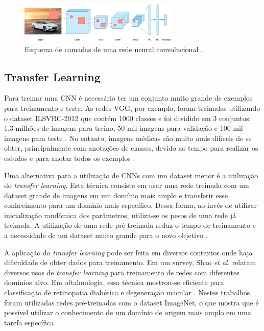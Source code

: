 \documentclass[conference]{IEEEtran}
\begin{document}

\begin{figure}[!tp]
 \centering
 \includegraphics[width=3in]{img/convolucao.png}
 \caption{Esquema de camadas de uma rede neural convolucional \cite{convTDS}.}
 \label{fig:convolucao}
\end{figure}


  \subsection{Transfer Learning}


  Para treinar uma CNN é necessário ter um conjunto muito grande de exemplos para treinamento e teste. As redes VGG, por exemplo, foram treinadas utilizando o dataset ILSVRC-2012 \cite{ILSVRC15} que contém 1000 classes e foi dividido em 3 conjuntos: 1.3 milhões de imagens para treino, 50 mil imagens para validação e 100 mil imagens para teste \cite{simonyan2014}. No entanto, imagens médicas são muito mais difíceis de se obter, principalmente com anotações de classes, devido ao tempo para realizar os estudos e para anotar todos os exemplos \cite{greenspan2016}.
  
  Uma alternativa para a utilização de CNNs com um dataset menor é a utilização do \textit{transfer learning}. Esta técnica consiste em usar uma rede treinada com um dataset grande de imagens em um domínio mais amplo e transferir esse conhecimento para um domínio mais específico. Dessa forma, ao invés de utilizar inicialização randômica dos parâmetros, utiliza-se os pesos de uma rede já treinada. A utilização de uma rede pré-treinada reduz o tempo de treinamento e a necessidade de um dataset muito grande para o novo objetivo \cite{tan2018}.

  A aplicação do \textit{transfer learning} pode ser feita em diversos contextos onde haja dificuldade de obter dados para treinamento. Em um survey, Shao \textit{et al.} \cite{shao2015} relatam diversos usos de \textit{transfer learning} para treinamento de redes com diferentes domínios alvo. Em oftalmologia, essa técnica mostrou-se eficiente para classificação de retinopatia diabética \cite{li2017} e degeneração macular \cite{lee2017}. Nestes trabalhos foram utilizadas redes pré-treinadas com o dataset ImageNet, o que mostra que é possível utilizar o conhecimento de um domínio de origem mais amplo em uma tarefa específica. 
\end{document}
